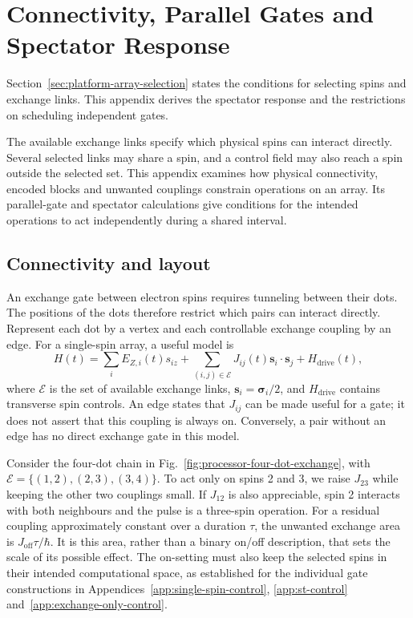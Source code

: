 \FloatBarrier
\section{Connectivity, Parallel Gates and Spectator Response}
\label{app:array-parallel-control}
\label{chap:quantum-processors}

Section~\ref{sec:platform-array-selection} states the conditions for
selecting spins and exchange links. This appendix derives the spectator
response and the restrictions on scheduling independent gates.

The available exchange links specify which physical spins can interact
directly. Several selected links may share a spin, and a control field
may also reach a spin outside the selected set. This appendix examines
how physical connectivity, encoded blocks and unwanted couplings
constrain operations on an array. Its parallel-gate and spectator
calculations give conditions for the intended operations to act
independently during a shared interval.

\subsection{Connectivity and layout}
\label{sec:connectivity-layout}

An exchange gate between electron spins requires tunneling between
their dots. The positions of the dots therefore restrict which
pairs can interact directly. Represent each dot by a vertex and
each controllable exchange coupling by an edge. For a single-spin
array, a useful model is
\begin{equation}
 H(t)=\sum_i E_{Z,i}(t)s_{iz}
       +\sum_{(i,j)\in\mathcal E}J_{ij}(t)
                   \mathbf s_i\cdot\mathbf s_j
       +H_{\mathrm{drive}}(t),
 \label{eq:processor-array-hamiltonian}
\end{equation}
where \(\mathcal E\) is the set of available exchange links,
\(\mathbf s_i=\boldsymbol{\sigma}_i/2\), and
\(H_{\mathrm{drive}}\) contains transverse spin controls. An edge
states that \(J_{ij}\) can be made useful for a gate; it does not
assert that this coupling is always on. Conversely, a pair without
an edge has no direct exchange gate in this model.

Consider the four-dot chain in
Fig.~\ref{fig:processor-four-dot-exchange}, with
\(\mathcal E=\{(1,2),(2,3),(3,4)\}\). To act only on spins 2 and 3,
we raise \(J_{23}\) while keeping the other two couplings small.
If \(J_{12}\) is also appreciable, spin 2 interacts with both
neighbours and the pulse is a three-spin operation. For a residual
coupling approximately constant over a duration \(\tau\), the
unwanted exchange area is \(J_{\mathrm{off}}\tau/\hbar\). It is this
area, rather than a binary on/off description, that sets the scale
of its possible effect. The on-setting must also keep the selected
spins in their intended computational space, as established for
the individual gate constructions in
Appendices~\ref{app:single-spin-control}, \ref{app:st-control}
and~\ref{app:exchange-only-control}.


